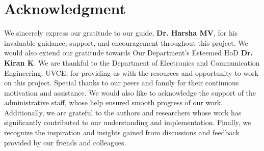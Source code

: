 \documentclass{article}
\numberwithin{equation}{section}
\numberwithin{figure}{section}
\numberwithin{table}{section}
\begin{document}
\maketitle
        \vspace{-2.5cm}
\titleGP %
    
\clearpage
	
	

\tableofcontents
	\thispagestyle{empty}
	\cleardoublepage
	\typeout{}





\section*{\centering \Large Acknowledgment} \vspace{1cm} 
 We sincerely express our gratitude to our guide, \textbf{Dr. Harsha MV}, for his invaluable guidance, support, and encouragement throughout this project. We would also extend our gratitude towards Our Department's Esteemed HoD \textbf{Dr. Kiran K}. We are thankful to the Department of Electronics and Communication Engineering, UVCE, for providing us with the resources and opportunity to work on this project. Special thanks to our peers and family for their continuous motivation and assistance. We would also like to acknowledge the support of the administrative staff, whose help ensured smooth progress of our work. Additionally, we are grateful to the authors and researchers whose work has significantly contributed to our understanding and implementation. Finally, we recognize the inspiration and insights gained from discussions and feedback provided by our friends and colleagues. 


\pagebreak


   
     
\end{document}
